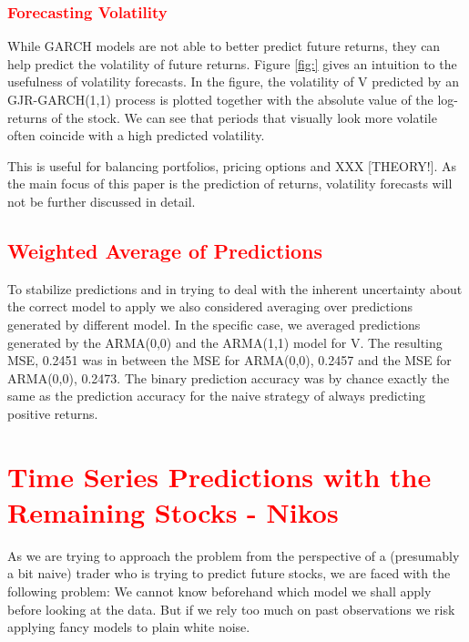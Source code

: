 \subsubsection{\textcolor{red}{Forecasting Volatility}}
While GARCH models are not able to better predict future returns, they can help predict the volatility of future returns. Figure \ref{fig:} gives an intuition to the usefulness of volatility forecasts. In the figure, the volatility of V predicted by an GJR-GARCH(1,1) process is plotted together with the absolute value of the log-returns of the stock. We can see that periods that visually look more volatile often coincide with a high predicted volatility. 

This is useful for balancing portfolios, pricing options and XXX [THEORY!]. As the main focus of this paper is the prediction of returns, volatility forecasts will not be further discussed in detail. 

\subsection{\textcolor{red}{Weighted Average of Predictions}}
To stabilize predictions and in trying to deal with the inherent uncertainty about the correct model to apply we also considered averaging over predictions generated by different model. In the specific case, we averaged predictions generated by the ARMA(0,0) and the ARMA(1,1) model for V. The resulting MSE, 0.2451 was in between the MSE for ARMA(0,0), 0.2457 and the MSE for ARMA(0,0), 0.2473. The binary prediction accuracy was by chance exactly the same as the prediction accuracy for the naive strategy of always predicting positive returns. 

\section{\textcolor{red}{Time Series Predictions with the Remaining Stocks - Nikos}}

As we are trying to approach the problem from the perspective of a (presumably a bit naive) trader who is trying to predict future stocks, we are faced with the following problem: We cannot know beforehand which model we shall apply before looking at the data. But if we rely too much on past observations we risk applying fancy models to plain white noise. 

